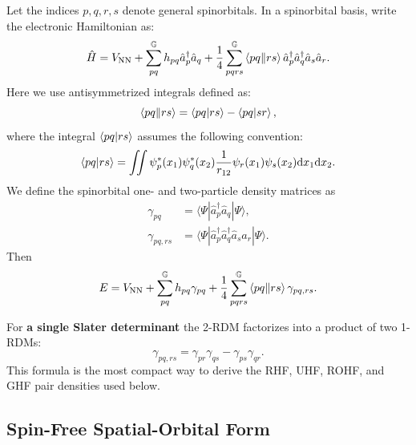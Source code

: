 \documentclass[aip,preprint]{revtex4-1}
\newcommand{\dd}{\mathrm{d}}
\begin{document}
Let the indices $p,q,r,s$ denote general spinorbitals.  In a spinorbital basis, write the electronic
Hamiltonian as:
\begin{equation}
\hat{H}
=
V_\mathrm{NN} +
\sum_{pq}^{\mathbb{G}} h_{pq}\hat{a}^\dagger_p\hat{a}_q
+
\frac{1}{4}
\sum_{pqrs}^{\mathbb{G}} \braket{pq\|rs}
\hat{a}^\dagger_p\hat{a}^\dagger_q\hat{a}_s\hat{a}_r.
\label{eq:spinorbital_hamiltonian}
\end{equation}
Here we use antisymmetrized integrals defined as:
\begin{equation}
\braket{pq\|rs} = \braket{pq|rs} - \braket{pq|sr},
\end{equation}
where the integral $\braket{pq|rs}$ assumes the following convention:
\begin{equation}
\braket{pq|rs}
= \iint
\psi^*_p(x_1) \psi^*_q(x_2)
\frac{1}{r_{12}}
\psi_r(x_1) \psi_s(x_2)
\dd x_1\dd x_2.
\end{equation}
We define the spinorbital one- and two-particle density matrices as
\begin{align}
\gamma_{pq}
&=
\langle \Psi |
\hat{a}^\dagger_p\hat{a}_q
| \Psi \rangle,
\label{eq:spinorbital_1rdm}\\
\gamma_{pq,rs}
&=
\langle \Psi |
\hat{a}^\dagger_p\hat{a}^\dagger_q\hat{a}_s\hat{a}_r
| \Psi \rangle.
\label{eq:spinorbital_2rdm}
\end{align}
Then
\begin{equation}
E
= V_\mathrm{NN} +
\sum_{pq}^{\mathbb{G}} h_{pq}\gamma_{pq}
+
\frac{1}{4}
\sum_{pqrs}^{\mathbb{G}} \braket{pq\|rs}\gamma_{pq,rs}.
\label{eq:spinorbital_energy}
\end{equation}

For \textbf{a single Slater determinant} the 2-RDM factorizes into a product of two 1-RDMs:
\begin{equation}
\gamma_{pq,rs}
=
\gamma_{pr}\gamma_{qs}
-
\gamma_{ps}\gamma_{qr}.
\label{eq:determinant_spinorbital_2rdm}
\end{equation}
This formula is the most compact way to derive the RHF, UHF, ROHF, and GHF
pair densities used below.


\subsection{Spin-Free Spatial-Orbital Form}
\end{document}
